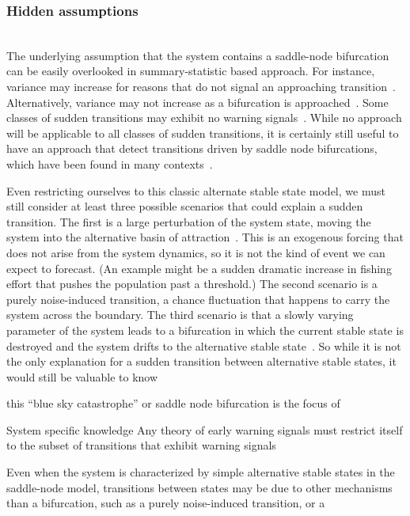 \documentclass[authoryear,preprint,11pt]{elsarticle}
\begin{document}
\subsubsection*{Hidden assumptions}\\
The underlying assumption that the system contains a saddle-node bifurcation
can be easily overlooked in summary-statistic based approach.  
For instance, variance may increase for reasons that 
do not signal an approaching transition~\citep{Schreiber2003, Schreiber2008}.
Alternatively, variance may not increase as a bifurcation is approached~\citep{Livina2012, Dakos2011a}.
Some classes of sudden transitions may exhibit no warning signals~\cite{Hastings2010}.   
While no approach will be applicable to all classes of sudden transitions,
it is certainly still useful to have an approach that detect transitions driven by 
saddle node bifurcations, which have been found in many contexts~\citep[\emph{e.g.}, see][]{Scheffer2001}.  

Even restricting ourselves to this classic alternate stable state model,
we must still consider at least three possible scenarios that could explain a sudden transition.  
The first is a large perturbation of the system state, moving the system into the alternative basin of attraction~\citep{Scheffer2001, Scheffer2001}.  
This is an exogenous forcing that does not arise from the system dynamics, so it is not the kind of event we can expect to forecast.  (An example might be a sudden dramatic increase in fishing effort that pushes the population past a threshold.)
The second scenario is a purely noise-induced transition, a chance fluctuation that happens to carry the system across the boundary.  
The third scenario is that a slowly varying parameter of the system leads to a bifurcation in which the current stable state is destroyed and the system drifts to the alternative stable state~\citep{Scheffer2009}.  So while it is not the only explanation for a sudden transition between alternative stable states, it would still be valuable to know

this ``blue sky catastrophe'' or saddle node bifurcation is the focus of 

System specific knowledge 
Any theory of early warning signals must restrict itself to the subset of transitions that exhibit warning signals

Even when the system is characterized by 
simple alternative stable states in the saddle-node model,
transitions between states may be due to other mechanisms than a bifurcation, such as a purely noise-induced transition,
or a 
\end{document}
